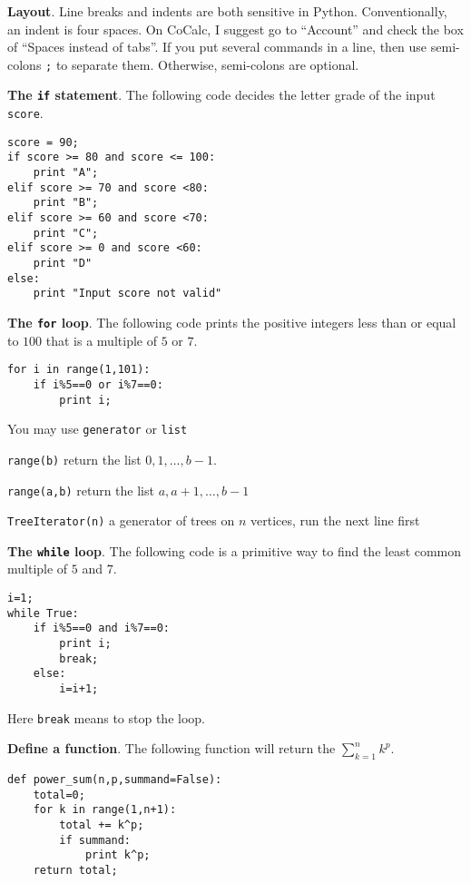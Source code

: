 \documentclass{article}
\newcommand{\heading}[1]{\medskip\textbf{#1}.}
\newenvironment{lwdes}{\begin{description}[leftmargin=1.7cm,align=left,labelwidth=1.5cm]}{\end{description}}
\begin{document}
\begin{multicols}{2}
\heading{Layout}  Line breaks and indents are both sensitive in Python.  Conventionally, an indent is four spaces.  On CoCalc, I suggest go to ``Account'' and check the box of ``Spaces instead of tabs''.  If you put several commands in a line, then use semi-colons \texttt{;} to separate them.  Otherwise, semi-colons are optional.

\heading{The \texttt{if} statement}  The following code decides the letter grade of the input \texttt{score}.

\begin{verbatim}
score = 90;
if score >= 80 and score <= 100:
    print "A";
elif score >= 70 and score <80:
    print "B";
elif score >= 60 and score <70:
    print "C";
elif score >= 0 and score <60:
    print "D"
else:
    print "Input score not valid"
\end{verbatim}

\heading{The \texttt{for} loop}  The following code prints the positive integers less than or equal to $100$ that is a multiple of $5$ or $7$.

\begin{verbatim}
for i in range(1,101):
    if i%5==0 or i%7==0:
        print i;
\end{verbatim}

You may use \texttt{generator} or \texttt{list}
\begin{lwdes}
\item[\texttt{range(b)}] return the list $0,1,\ldots,b-1$.
\item[\texttt{range(a,b)}] return the list $a,a+1,\ldots,b-1$
\item[\texttt{TreeIterator(n)}] a generator of trees on $n$ vertices, run the next line first\\
\end{lwdes}

\heading{The \texttt{while} loop}  The following code is a primitive way to find the least common multiple of $5$ and $7$.

\begin{verbatim}
i=1;
while True:
    if i%5==0 and i%7==0:
        print i;
        break;
    else:
        i=i+1;
\end{verbatim}

Here \texttt{break} means to stop the loop.

\heading{Define a function}  The following function will return  the $\sum_{k=1}^n k^p$.

\begin{verbatim}
def power_sum(n,p,summand=False):
    total=0;
    for k in range(1,n+1):
        total += k^p;
        if summand:
            print k^p;
    return total;
\end{verbatim}


\end{multicols}
\end{document}
